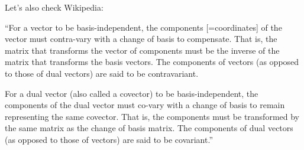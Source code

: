 Let's also check Wikipedia:
\begin{items}
\item ``For a vector to be basis-independent, the components [=coordinates] of the
  vector must contra-vary with a change of basis to compensate. That
  is, the matrix that transforms the vector of components must be the
  inverse of the matrix that transforms the basis vectors. The
  components of vectors (as opposed to those of dual vectors) are said
  to be contravariant.
\item For a dual vector (also called a covector) to be
  basis-independent, the components of the dual vector must co-vary
  with a change of basis to remain representing the same
  covector. That is, the components must be transformed by the same
  matrix as the change of basis matrix. The components of dual vectors
  (as opposed to those of vectors) are said to be covariant.''
\end{items}



